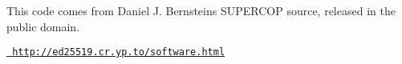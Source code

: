 This code comes from Daniel J. Bernstein\textquotesingle{}s S\+U\+P\+E\+R\+C\+OP source, released in the public domain.

\href{http://ed25519.cr.yp.to/software.html}{\texttt{ http\+://ed25519.\+cr.\+yp.\+to/software.\+html}} 